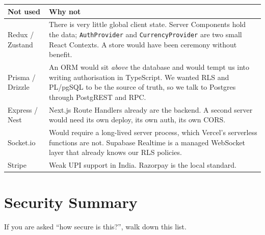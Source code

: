\documentclass[11pt,a4paper]{article}
\begin{document}
\begin{longtable}{@{}p{3.3cm}p{11.5cm}@{}}
\toprule
\textbf{Not used} & \textbf{Why not} \\
\midrule
\endhead
Redux / Zustand & There is very little global client state. Server Components hold
the data; \texttt{AuthProvider} and \texttt{CurrencyProvider} are two small React
Contexts. A store would have been ceremony without benefit. \\
\addlinespace
Prisma / Drizzle & An ORM would sit \emph{above} the database and would tempt us
into writing authorisation in TypeScript. We wanted RLS and PL/pgSQL to be the
source of truth, so we talk to Postgres through PostgREST and RPC. \\
\addlinespace
Express / Nest & Next.js Route Handlers already are the backend. A second server
would need its own deploy, its own auth, its own CORS. \\
\addlinespace
Socket.io & Would require a long-lived server process, which Vercel's serverless
functions are not. Supabase Realtime is a managed WebSocket layer that already
knows our RLS policies. \\
\addlinespace
Stripe & Weak UPI support in India. Razorpay is the local standard. \\
\bottomrule
\end{longtable}

\newpage
\section{Security Summary}

If you are asked ``how secure is this?'', walk down this list.
\end{document}
